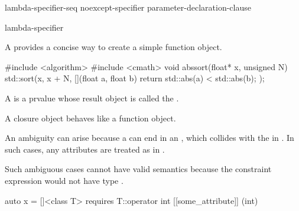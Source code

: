 \begin{bnf}
\br
    \terminal{[}  \terminal{]}
\end{bnf}

\begin{bnf}
\br
    lambda-specifier-seq   \br
    \bnfindent {}\br
    noexcept-specifier   \br
     \br
    \terminal{(} parameter-declaration-clause \terminal{)}   \br
    \bnfindent {}  
\end{bnf}

\begin{bnf}
\br
    \br
    \br
    \br
\end{bnf}

\begin{bnf}
\br
    lambda-specifier 
\end{bnf}

\pnum
A  provides
a concise way to create a simple function object.
\begin{example}
\begin{codeblock}
#include <algorithm>
#include <cmath>
void abssort(float* x, unsigned N) {
  std::sort(x, x + N, [](float a, float b) { return std::abs(a) < std::abs(b); });
}
\end{codeblock}
\end{example}

\pnum
A  is a prvalue
whose result object is called the .
\begin{note}
A closure object behaves like a function
object.
\end{note}

\pnum
An ambiguity can arise
because a  can end in
an ,
which collides with
the  in .
In such cases,
any attributes are treated as
 in .
\begin{note}
Such ambiguous cases cannot have valid semantics
because the constraint expression would not have type .
\begin{example}
\begin{codeblock}
auto x = []<class T> requires T::operator int [[some_attribute]] (int) { }
\end{codeblock}
\end{example}
\end{note}


